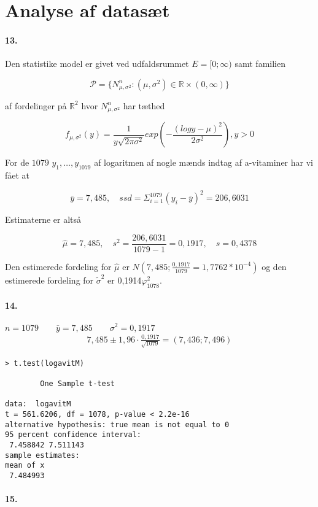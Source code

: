 \section{Analyse af datasæt}

\paragraph{13.}
Den statistike model er givet ved udfaldsrummet $E=[0; \infty)$ samt
familien

\begin{equation*}
  \mathcal{P} =\{ N^n_{\mu,\sigma^2} : (\mu, \sigma^2) \in \mathbb{R}
  \times (0, \infty) \}
\end{equation*}

af fordelinger på $\mathbb{R}^2$ hvor $N^n_{\mu, \sigma^2}$ har tæthed

\begin{equation*}
  f_{\mu, \sigma^2}(y) = \frac{1}{y \sqrt{2\pi\sigma^2}} exp ( -
  \frac{(log y - \mu)^2}{2\sigma^2} ), y>0
\end{equation*}

For de $1079$ $y_1, \ldots, y_{1079}$ af logaritmen af nogle mænds
indtag af a-vitaminer har vi fået at

\begin{equation*}
  \bar{y} = 7,485, \quad ssd = \Sigma^{1079}_{i=1}(y_i - \bar{y})^2 =
  206,6031
\end{equation*}

Estimaterne er altså

\begin{equation*}
  \hat{\mu} = 7,485, \quad s^2 = \frac{206,6031}{1079-1} = 0,1917, \quad
  s = 0,4378
\end{equation*}

Den estimerede fordeling for $\hat{\mu}$ er $N(7,485;
\frac{0,1917}{1079} = 1,7762 * 10^{-4})$ og den estimerede fordeling
for $\tilde{\sigma}^2$ er 0,1914$\varphi^2_{1078}$.

\paragraph{14.} 
$n = 1079 \qquad \bar{y} = 7,485 \qquad \sigma^2 = 0,1917$
\begin{align*}
7,485 \pm 1,96 \cdot \frac{0,1917}{\sqrt{1079}} = (7,436 ; 7,496)
\end{align*}

\begin{verbatim}
> t.test(logavitM)

        One Sample t-test

data:  logavitM 
t = 561.6206, df = 1078, p-value < 2.2e-16
alternative hypothesis: true mean is not equal to 0 
95 percent confidence interval:
 7.458842 7.511143 
sample estimates:
mean of x 
 7.484993 
\end{verbatim}

\paragraph{15.}
